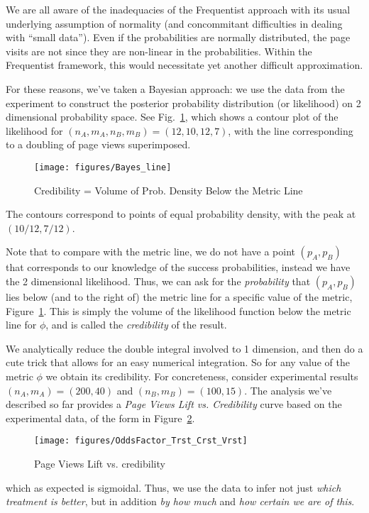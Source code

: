 \documentclass[letterpaper,12pt]{article}
\begin{document}
We are all aware of the inadequacies of the Frequentist approach with
its usual underlying assumption of normality (and concommitant
difficulties in dealing with ``small data''). Even if the
probabilities are normally distributed, the page visits are not since
they are non-linear in the probabilities. Within the Frequentist
framework, this would necessitate yet another difficult approximation.

For these reasons, we've taken a Bayesian approach: we use the data
from the experiment to construct the posterior probability
distribution (or likelihood) on 2 dimensional probability space. See
Fig.~\ref{fig:Bayes_line}, which shows a contour plot of the likelihood
for \((n_A, m_A, n_B, m_B) = (12,10,12,7)\), with the line
corresponding to a doubling of page views superimposed.
\begin{figure}[ht!]
\centering
\texttt{[image: figures/Bayes\_line]}
\caption{Credibility = Volume of Prob. Density Below the Metric Line
  \label{fig:Bayes_line}}
\end{figure}
The contours correspond to points of equal probability density, with
the peak at \((10/12, 7/12)\).

Note that to compare with the metric line, we do not have a point
\((p_A,p_B)\) that corresponds to our knowledge of the success
probabilities, instead we have the 2 dimensional likelihood. Thus, we
can ask for the {\em probability} that \((p_A,p_B)\) lies below (and
to the right of) the metric line for a specific value of the metric,
Figure~\ref{fig:Bayes_line}.  This is simply the volume of the
likelihood function below the metric line for \(\phi\), and is
called the {\em credibility} of the result.

We analytically reduce the double integral involved to 1 dimension,
and then do a cute trick that allows for an easy numerical integration. So for
any value of the metric \(\phi\) we obtain its credibility.  For
concreteness, consider experimental results \((n_A, m_A) = (200, 40)\)
and \((n_B, m_B) = (100, 15)\). The analysis we've described so far
provides a {\em Page Views Lift vs. Credibility} curve based on the
experimental data, of the form in Figure~\ref{fig:odds_vs_cred}.
\begin{figure}[ht!]
\centering
\texttt{[image: figures/OddsFactor\_Trst\_Crst\_Vrst]}
\caption{Page Views Lift vs. credibility \label{fig:odds_vs_cred}}
\end{figure}
which as expected is sigmoidal. Thus, we use the data to infer not
just {\em which treatment is better}, but in addition {\em by how
  much} and {\em how certain we are of this}.
\end{document}
